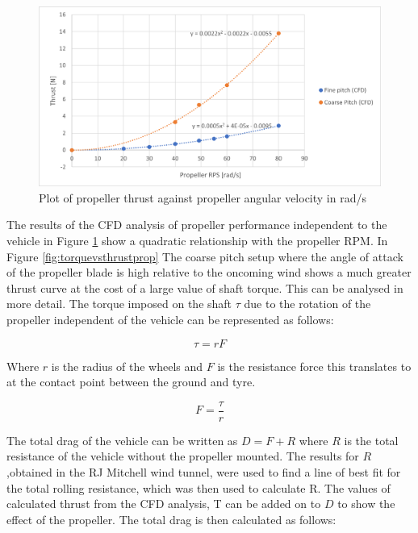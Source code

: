 \begin{figure}[!htbp]
    \centering
    \includegraphics[width = 0.9\linewidth]{images/part10.1/thrustvsRPMplot.png}
    \caption{Plot of propeller thrust against propeller angular velocity in rad/s}
    \label{fig:thrustvsRPMplot}
\end{figure}

The results of the CFD analysis of propeller performance independent to the vehicle in Figure \ref{fig:thrustvsRPMplot} show a quadratic relationship with the propeller RPM. In Figure \ref{fig:torquevsthrustprop} The coarse pitch setup where the angle of attack of the propeller blade is high relative to the oncoming wind shows a much greater thrust curve at the cost of a large value of shaft torque. This can be analysed in more detail. The torque imposed on the shaft $\tau$ due to the rotation of the propeller independent of the vehicle can be represented as follows:

\begin{equation}
    \tau=r F
\end{equation}

Where $r$ is the radius of the wheels and $F$ is the resistance force this translates to at the contact point between the ground and tyre. 

\begin{equation}
    F=\frac{\tau}{r}
\end{equation}

The total drag of the vehicle can be written as $D=F+R$ where $R$ is the total resistance of the vehicle without the propeller mounted. 
The results for $R$ ,obtained in the RJ Mitchell wind tunnel, were used to find a line of best fit for the total rolling resistance, which was then used to calculate R. The values of calculated thrust from the CFD analysis, T can be added on to $D$ to show the effect of the propeller. The total drag is then calculated as follows:


